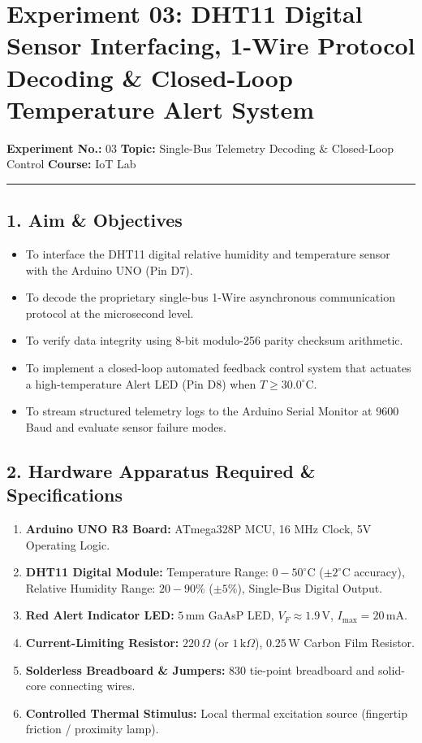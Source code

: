 \documentclass[11pt,a4paper]{article}
\begin{document}
\section*{Experiment 03: DHT11 Digital Sensor Interfacing, 1-Wire Protocol Decoding \& Closed-Loop Temperature Alert System}
\noindent\textbf{Experiment No.:} 03 \hfill \textbf{Topic:} Single-Bus Telemetry Decoding \& Closed-Loop Control \hfill \textbf{Course:} IoT Lab
\vspace{0.05cm}
\hrule
\vspace{0.25cm}

\subsection*{1. Aim \& Objectives}
\begin{itemize}[noitemsep]
    \item To interface the DHT11 digital relative humidity and temperature sensor with the Arduino UNO (Pin D7).
    \item To decode the proprietary single-bus 1-Wire asynchronous communication protocol at the microsecond level.
    \item To verify data integrity using 8-bit modulo-256 parity checksum arithmetic.
    \item To implement a closed-loop automated feedback control system that actuates a high-temperature Alert LED (Pin D8) when $T \ge 30.0^\circ\text{C}$.
    \item To stream structured telemetry logs to the Arduino Serial Monitor at 9600 Baud and evaluate sensor failure modes.
\end{itemize}

\subsection*{2. Hardware Apparatus Required \& Specifications}
\begin{enumerate}[noitemsep]
    \item \textbf{Arduino UNO R3 Board:} ATmega328P MCU, 16 MHz Clock, 5V Operating Logic.
    \item \textbf{DHT11 Digital Module:} Temperature Range: $0-50^\circ\text{C}$ ($\pm 2^\circ\text{C}$ accuracy), Relative Humidity Range: $20-90\%$ ($\pm 5\%$), Single-Bus Digital Output.
    \item \textbf{Red Alert Indicator LED:} $5\,\text{mm}$ GaAsP LED, $V_F \approx 1.9\,\text{V}$, $I_{\max} = 20\,\text{mA}$.
    \item \textbf{Current-Limiting Resistor:} $220\,\Omega$ (or $1\,\text{k}\Omega$), $0.25\,\text{W}$ Carbon Film Resistor.
    \item \textbf{Solderless Breadboard \& Jumpers:} 830 tie-point breadboard and solid-core connecting wires.
    \item \textbf{Controlled Thermal Stimulus:} Local thermal excitation source (fingertip friction / proximity lamp).
\end{enumerate}
\end{document}
